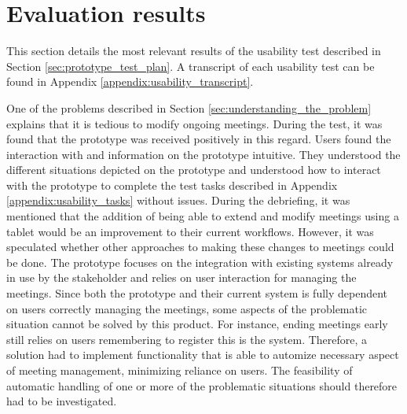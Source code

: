 \section{Evaluation results}\label{sec:usability_evaluation_results}
This section details the most relevant results of the usability test described in Section \ref{sec:prototype_test_plan}.
A transcript of each usability test can be found in Appendix \ref{appendix:usability_transcript}.

One of the problems described in Section \ref{sec:understanding_the_problem} explains that it is tedious to modify ongoing meetings. 
During the test, it was found that the prototype was received positively in this regard. 
Users found the interaction with and information on the prototype intuitive. 
They understood the different situations depicted on the prototype and understood how to interact with the prototype to complete the test tasks described in Appendix \ref{appendix:usability_tasks} without issues.
During the debriefing, it was mentioned that the addition of being able to extend and modify meetings using a tablet would be an improvement to their current workflows.
However, it was speculated whether other approaches to making these changes to meetings could be done. 
The prototype focuses on the integration with existing systems already in use by the stakeholder and relies on user interaction for managing the meetings.
Since both the prototype and their current system is fully dependent on users correctly managing the meetings, some aspects of the problematic situation cannot be solved by this product. 
For instance, ending meetings early still relies on users remembering to register this is the system. 
Therefore, a solution had to implement functionality that is able to automize necessary aspect of meeting management, minimizing reliance on users.
The feasibility of  automatic handling of one or more of the problematic situations should therefore had to be investigated.